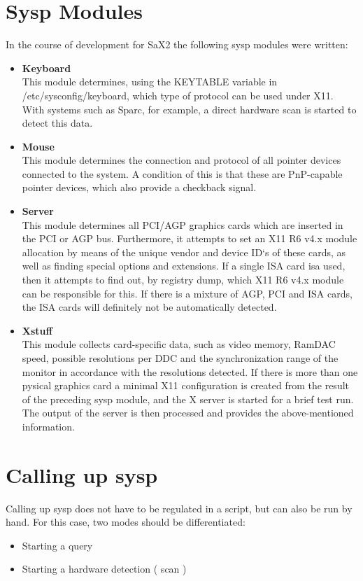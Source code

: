 \section{Sysp Modules}
In the course of development for SaX2 the following sysp modules were written:
\begin{itemize}
\item \textbf{Keyboard}\\
      This module determines, using the KEYTABLE variable in 
      /etc/sysconfig/keyboard, which type of protocol can be used under X11.
      With systems such as Sparc, for example, a direct hardware scan is
      started to detect this data.
\item \textbf{Mouse}\\
      This module determines the connection and protocol of all pointer
      devices connected to the system. A condition of this is that these are
      PnP-capable pointer devices, which also provide a checkback signal.
\item \textbf{Server}\\
      This module determines all PCI/AGP graphics cards which are inserted in
      the PCI or AGP bus. Furthermore, it attempts to set an X11 R6 v4.x
      module allocation by means of the unique vendor and device ID`s of these
      cards, as well as finding special options and extensions. If a single
      ISA card isa used, then it attempts to find out, by registry dump, which
      X11 R6 v4.x module can be responsible for this. If there is a mixture of
      AGP, PCI and ISA cards, the ISA cards will definitely not be
      automatically detected.
\item \textbf{Xstuff}\\
      This module collects card-specific data, such as video memory, RamDAC
      speed, possible resolutions per DDC and the synchronization range of the
      monitor in accordance with the resolutions detected. If there is more
	  than one pysical graphics card a minimal X11 configuration is created
      from the result of the preceding sysp module, and the X server is
      started for a brief test run. The output of the server is then
      processed and provides the above-mentioned information.
\end{itemize}

\section{Calling up sysp}
Calling up sysp does not have to be regulated in a script, but can also be run
by hand. For this case, two modes should be differentiated:
\begin{itemize}
\item Starting a query
\item Starting a hardware detection ( scan )
\end{itemize}

